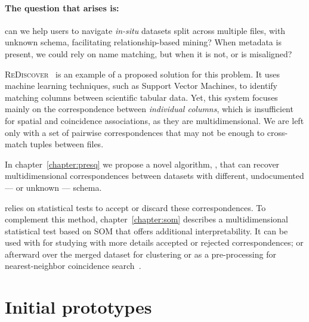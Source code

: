 \paragraph{The question that arises is:} can we help users to navigate \textit{in-situ} datasets
split across multiple files, with unknown schema, facilitating relationship-based mining?
When metadata is present, we could rely on name matching, but when it is not, or is misaligned?

\textsc{ReDiscover}~\cite{alawini2016} is an example of a proposed solution for this problem.
It uses machine learning techniques, such as Support Vector Machines, to identify matching
columns between scientific tabular data.
Yet, this system focuses mainly on the correspondence between \emph{individual columns},
which is insufficient for spatial and coincidence associations, as they are multidimensional.
We are left only with a set of pairwise correspondences that may not be enough to cross-match
tuples between files.

In chapter~\ref{chapter:presq} we propose a novel algorithm, \PresQ, that can recover
multidimensional correspondences between datasets with different, undocumented --- or unknown --- schema.

\PresQ relies on statistical tests to accept or discard these correspondences.
To complement this method, chapter~\ref{chapter:som} describes a multidimensional
statistical test based on \gls{SOM} that offers additional interpretability. It can be used
with \PresQ for studying with more details accepted or rejected correspondences;
or afterward over the merged dataset for clustering or as a pre-processing for nearest-neighbor
coincidence search~\cite{silva2011som}.



\section{Initial prototypes}
